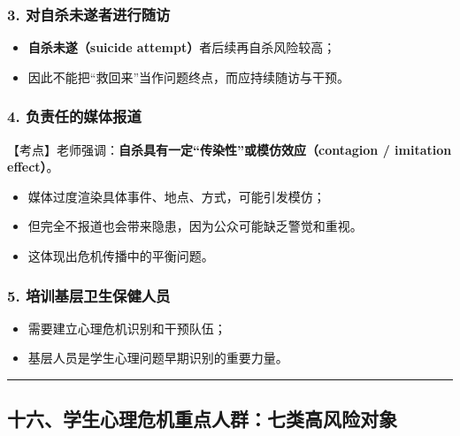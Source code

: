\documentclass[
  chinese,
  9pt,
  a4paper,
]{ctexart}
\providecommand{\tightlist}{%
  \setlength{\itemsep}{0pt}\setlength{\parskip}{0pt}}
\begin{document}
\subsubsection{3.
对自杀未遂者进行随访}\label{ux5bf9ux81eaux6740ux672aux9042ux8005ux8fdbux884cux968fux8bbf}

\begin{itemize}
\tightlist
\item
  \textbf{自杀未遂（suicide attempt）}者后续再自杀风险较高；
\item
  因此不能把``救回来''当作问题终点，而应持续随访与干预。
\end{itemize}

\subsubsection{4.
负责任的媒体报道}\label{ux8d1fux8d23ux4efbux7684ux5a92ux4f53ux62a5ux9053}

【考点】老师强调：\textbf{自杀具有一定``传染性''或模仿效应（contagion /
imitation effect）}。

\begin{itemize}
\tightlist
\item
  媒体过度渲染具体事件、地点、方式，可能引发模仿；
\item
  但完全不报道也会带来隐患，因为公众可能缺乏警觉和重视。
\item
  这体现出危机传播中的平衡问题。
\end{itemize}

\subsubsection{5.
培训基层卫生保健人员}\label{ux57f9ux8badux57faux5c42ux536bux751fux4fddux5065ux4ebaux5458}

\begin{itemize}
\tightlist
\item
  需要建立心理危机识别和干预队伍；
\item
  基层人员是学生心理问题早期识别的重要力量。
\end{itemize}

\begin{center}\rule{0.5\linewidth}{0.5pt}\end{center}

\subsection{十六、学生心理危机重点人群：七类高风险对象}\label{ux5341ux516dux5b66ux751fux5fc3ux7406ux5371ux673aux91cdux70b9ux4ebaux7fa4ux4e03ux7c7bux9ad8ux98ceux9669ux5bf9ux8c61}
\end{document}

